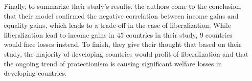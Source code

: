 Finally, to summarize their study's results, the authors come to the conclusion, that their model confirmed the negative
correlation between income gains and equality gains, which leads to a trade-off in the case of liberalization. While liberalization
lead to income gains in 45 countries in their study, 9 countries would face losses instead. To finish, they give their thought that
based on their study, the majority of developing countries would profit of liberalization and that the ongoing trend of protectionism
is causing significant welfare losses in developing countries. 